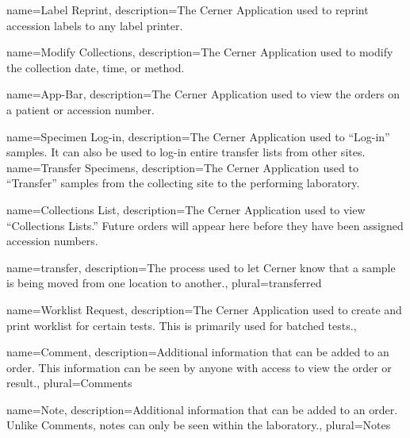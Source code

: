 
{
    name={Label Reprint},
    description={The Cerner Application used to reprint accession labels to any label printer.}
}

{
    name={Modify Collections},
    description={The Cerner Application used to modify the collection date, time, or method.}
}

{
  name=App-Bar,
  description={The Cerner Application used to view the orders on a patient or accession number.}
}



{
    name={Specimen Log-in},
    description={The Cerner Application used to ``Log-in'' samples. It can also be used to log-in entire transfer lists from other sites.}
}
{
    name={Transfer Specimens},
    description={The Cerner Application used to ``Transfer'' samples from the collecting site to the performing laboratory.}
}


{
    name={Collections List},
    description={The Cerner Application used to view ``Collections Lists.'' Future orders will appear here before they have been assigned accession numbers.}
}

{
    name={transfer},
    description={The process used to let Cerner know that a sample is being moved from one location to another.},
    plural={transferred}

}

{
    name={Worklist Request},
    description={The Cerner Application used to create and print worklist for certain tests. This is primarily used for batched tests.},
}

{
    name={Comment},
    description={Additional information that can be added to an order. This information can be seen by anyone with access to view the order or result.},
    plural={Comments}
}

{
    name={Note},
    description={Additional information that can be added to an order. Unlike Comments, notes can only be seen within the laboratory.},
    plural={Notes}
}

